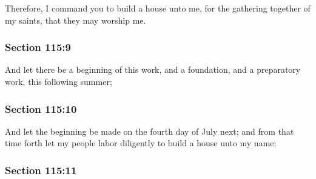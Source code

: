 		Therefore, I command you to build a house unto me, for the gathering together of my saints, that they may worship me.


	\subsubsection{Section 115:9} %
		\label{DC115-9}

		And let there be a beginning of this work, and a foundation, and a preparatory work, this following summer;


	\subsubsection{Section 115:10} %
		\label{DC115-10}

		And let the beginning be made on the fourth day of July next; and from that time forth let my people labor diligently to build a house unto my name;


	\subsubsection{Section 115:11} %
		\label{DC115-11}

